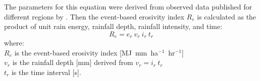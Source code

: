 \documentclass[gmd, manuscript]{copernicus}
\begin{document}
\noindent
The parameters for this equation were derived from observed data
published for different regions by \cite{Panagos2017}.
\noindent
Then the event-based erosivity index $R_e$ 
is calculated as the product of 
unit rain energy, rainfall depth, rainfall intensity, and time: 
\begin{equation}
\label{eq:erosivity_index}
{R_e = e_r ~ v_r ~ i_r ~ t_r}
\end{equation}
%
{\small
\noindent
where: \\
\hspace*{0.5em} $R_e$ is the event-based erosivity index [\unit{MJ~mm~ha}$^{-1}$~\unit{hr}$^{-1}$]\\
\hspace*{0.5em} $v_r$ is the rainfall depth [\unit{mm}] derived from ${v_r = i_r~t_r}$\\
\hspace*{0.5em} $t_r$ is the time interval [\unit{s}].
}



\end{document}
